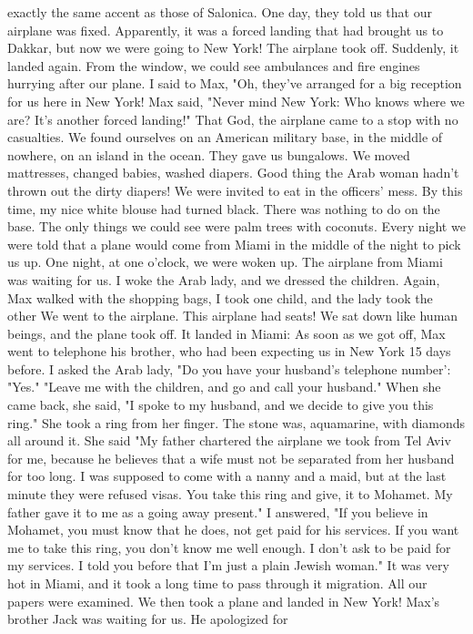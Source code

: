 exactly the same accent as those of Salonica. One day, they told us that 
our airplane was fixed. Apparently, it was a forced landing that had 
brought us to Dakkar, but now we were going to New York!
The airplane took off. Suddenly, it landed again. From the window, we could see ambulances and fire engines hurrying after our plane. I 
said to Max, "Oh, they've arranged for a big reception for us here in 
New York!
Max said, "Never mind New York: Who knows where we are? It's another 
forced landing!" That God, the airplane came to a stop with no 
casualties. We found ourselves on an American military base, in the middle of nowhere, on an island in the ocean. They gave us bungalows. We 
moved mattresses, changed babies, washed diapers. Good thing the Arab 
woman hadn't thrown out the dirty diapers! We were invited to eat in the 
officers' mess. By this time, my nice white blouse had turned black. 
There was nothing to do on the base. The only things we could see were 
palm trees with coconuts. Every night we were told that a plane would 
come from Miami in the middle of the night to pick us up. One night, at 
one o'clock, we were woken up. The airplane from Miami was waiting for 
us. I woke the Arab lady, and we dressed the children. Again, Max walked with the shopping bags, I took one child, and the lady took the other 
We went to the airplane. 
This airplane had seats! We sat down like human beings, and the
plane took off. It landed in Miami: As soon as we got off, Max went to 
telephone his brother, who had been expecting us in New York 15 days before. 
I asked the Arab lady, "Do you have your husband's telephone number': 
"Yes." 
"Leave me with the children, and go and call your husband." 
When she came back, she said, "I spoke to my husband, and we decide 
to give you this ring." She took a ring from her finger. The stone was, 
aquamarine, with diamonds all around it. 
She said "My father chartered the airplane we took from Tel Aviv for 
me, because he believes that a wife must not be separated from her husband 
for too long. I was supposed to come with a nanny and a maid, but 
at the last minute they were refused visas. You take this ring and give, 
it to Mohamet. My father gave it to me as a going away present." 
I answered, "If you believe in Mohamet, you must know that he does, 
not get paid for his services. If you want me to take this ring, you 
don't know me well enough. I don't ask to be paid for my services. I 
told you before that I'm just a plain Jewish woman." 
It was very hot in Miami, and it took a long time to pass through it 
migration. All our papers were examined. We then took a plane and landed in New York! Max's brother Jack was waiting for us. He apologized for 
